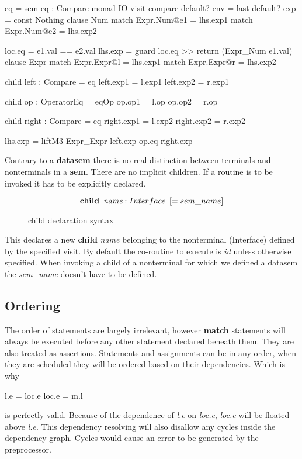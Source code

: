 \begin{code}
eq = sem eq : Compare monad IO
       visit compare
         default? env = last
         default? exp = const Nothing
         clause Num
           match Expr.Num@e1 = lhs.exp1
           match Expr.Num@e2 = lhs.exp2
           
           loc.eq  = e1.val == e2.val
           lhs.exp = guard loc.eq >> return (Expr_Num e1.val)
         clause Expr
           match Expr.Expr@l = lhs.exp1
           match Expr.Expr@r = lhs.exp2
           
           child left : Compare = eq
           left.exp1 = l.exp1
           left.exp2 = r.exp1
           
           child op : OperatorEq = eqOp
           op.op1 = l.op
           op.op2 = r.op
           
           child right : Compare = eq
           right.exp1 = l.exp2
           right.exp2 = r.exp2
           
           lhs.exp = liftM3 Expr_Expr left.exp op.eq right.exp
\end{code}

Contrary to a \textbf{datasem} there is no real distinction between terminals and nonterminals in a \textbf{sem}. There are no implicit children. If a routine is to be invoked it has to be explicitly declared.

\begin{figure}[h!]
\[
\textbf{child} \hspace{5pt} \emph{name} : Interface \hspace{5pt} [= sem\_name]
\]
\caption{child declaration syntax}
\end{figure}

This declares a new \textbf{child} \emph{name} belonging to the nonterminal (Interface) defined by the specified visit\cite{visitag}. By default the co-routine to execute is \emph{id} unless otherwise specified. When invoking a child of a nonterminal for which we defined a datasem the \emph{sem\_name} doesn't have to be defined.

\subsection{Ordering}
The order of statements are largely irrelevant, however \textbf{match} statements will always be executed before any other statement declared beneath them. They are also treated as assertions. Statements and assignments can be in any order, when they are scheduled they will be ordered based on their dependencies. Which is why

\begin{code}
l.e = loc.e
loc.e = m.l
\end{code}

is perfectly valid. Because of the dependence of \emph{l.e} on \emph{loc.e}, \emph{loc.e} will be floated above \emph{l.e}. This dependency resolving will also disallow any cycles inside the dependency graph. Cycles would cause an error to be generated by the preprocessor.

